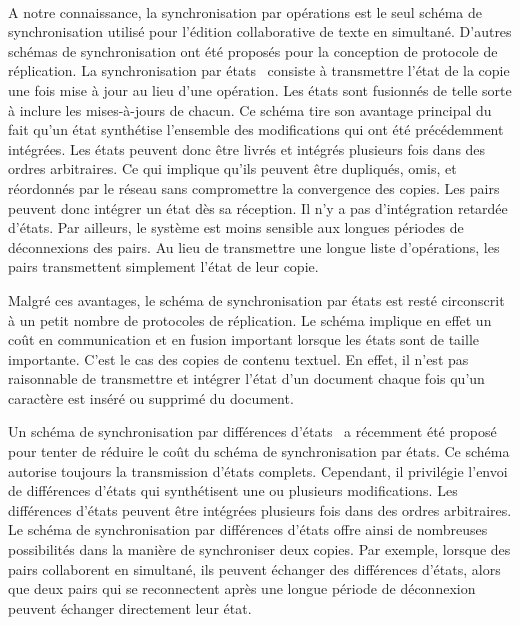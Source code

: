 \paragraph{}A notre connaissance, la synchronisation par opérations est le seul schéma de synchronisation utilisé pour l'édition collaborative de texte en simultané.
D'autres schémas de synchronisation ont été proposés pour la conception de protocole de réplication.
La synchronisation par états~\autocite{shapiro_2011_crdt} consiste à transmettre l'état de la copie une fois mise à jour au lieu d'une opération.
Les états sont fusionnés de telle sorte à inclure les mises-à-jours de chacun.
Ce schéma tire son avantage principal du fait qu'un état synthétise l'ensemble des modifications qui ont été précédemment intégrées.
Les états peuvent donc être livrés et intégrés plusieurs fois dans des ordres arbitraires.
Ce qui implique qu'ils peuvent être dupliqués, omis, et réordonnés par le réseau sans compromettre la convergence des copies.
Les pairs peuvent donc intégrer un état dès sa réception.
Il n'y a pas d'intégration retardée d'états.
Par ailleurs, le système est moins sensible aux longues périodes de déconnexions des pairs.
Au lieu de transmettre une longue liste d'opérations, les pairs transmettent simplement l'état de leur copie.

Malgré ces avantages, le schéma de synchronisation par états est resté circonscrit à un petit nombre de protocoles de réplication.
Le schéma implique en effet un coût en communication et en fusion important lorsque les états sont de taille importante.
C'est le cas des copies de contenu textuel.
En effet, il n'est pas raisonnable de transmettre et intégrer l'état d'un document chaque fois qu'un caractère est inséré ou supprimé du document.

Un schéma de synchronisation par différences d'états~\autocite{almeida_2018_delta-crdt-revisited} a récemment été proposé pour tenter de réduire le coût du schéma de synchronisation par états.
Ce schéma autorise toujours la transmission d'états complets.
Cependant, il privilégie l'envoi de différences d'états qui synthétisent une ou plusieurs modifications.
Les différences d'états peuvent être intégrées plusieurs fois dans des ordres arbitraires.
Le schéma de synchronisation par différences d'états offre ainsi de nombreuses possibilités dans la manière de synchroniser deux copies.
Par exemple, lorsque des pairs collaborent en simultané, ils peuvent échanger des différences d'états, alors que deux pairs qui se reconnectent après une longue période de déconnexion peuvent échanger directement leur état.

